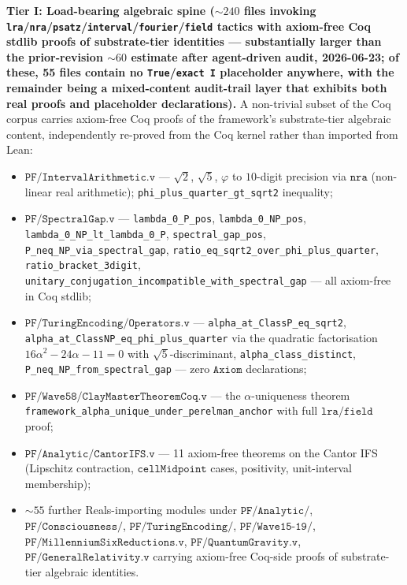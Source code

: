 \documentclass[11pt,a4paper]{amsart}
\theoremstyle{plain}
\theoremstyle{definition}
\begin{document}
\textbf{Tier I: Load-bearing algebraic spine ($\sim 240$ files invoking \texttt{lra}/\texttt{nra}/\texttt{psatz}/\texttt{interval}/\texttt{fourier}/\texttt{field} tactics with axiom-free Coq stdlib proofs of substrate-tier identities --- substantially larger than the prior-revision $\sim 60$ estimate after agent-driven audit, 2026-06-23; of these, 55 files contain no \texttt{True}/\texttt{exact I} placeholder anywhere, with the remainder being a mixed-content audit-trail layer that exhibits both real proofs and placeholder declarations).} A non-trivial subset of the Coq corpus carries axiom-free Coq proofs of the framework's substrate-tier algebraic content, independently re-proved from the Coq kernel rather than imported from Lean:
\begin{itemize}[leftmargin=2em,itemsep=2pt]
\item $\texttt{PF/IntervalArithmetic.v}$ --- $\sqrt{2}$, $\sqrt{5}$, $\varphi$ to $10$-digit precision via $\texttt{nra}$ (non-linear real arithmetic); \texttt{phi\_plus\_quarter\_gt\_sqrt2} inequality;
\item $\texttt{PF/SpectralGap.v}$ --- \texttt{lambda\_0\_P\_pos}, \texttt{lambda\_0\_NP\_pos}, \texttt{lambda\_0\_NP\_lt\_lambda\_0\_P}, \texttt{spectral\_gap\_pos}, \texttt{P\_neq\_NP\_via\_spectral\_gap}, \texttt{ratio\_eq\_sqrt2\_over\_phi\_plus\_quarter}, \texttt{ratio\_bracket\_3digit}, \texttt{unitary\_conjugation\_incompatible\_with\_spectral\_gap} --- all axiom-free in Coq stdlib;
\item $\texttt{PF/TuringEncoding/Operators.v}$ --- \texttt{alpha\_at\_ClassP\_eq\_sqrt2}, \texttt{alpha\_at\_ClassNP\_eq\_phi\_plus\_quarter} via the quadratic factorisation $16\alpha^2 - 24\alpha - 11 = 0$ with $\sqrt{5}$-discriminant, \texttt{alpha\_class\_distinct}, \texttt{P\_neq\_NP\_from\_spectral\_gap} --- zero $\texttt{Axiom}$ declarations;
\item $\texttt{PF/Wave58/ClayMasterTheoremCoq.v}$ --- the $\alpha$-uniqueness theorem \texttt{framework\_alpha\_unique\_under\_perelman\_anchor} with full $\texttt{lra}/\texttt{field}$ proof;
\item $\texttt{PF/Analytic/CantorIFS.v}$ --- 11 axiom-free theorems on the Cantor IFS (Lipschitz contraction, $\texttt{cellMidpoint}$ cases, positivity, unit-interval membership);
\item $\sim 55$ further Reals-importing modules under $\texttt{PF/Analytic/}$, $\texttt{PF/Consciousness/}$, $\texttt{PF/TuringEncoding/}$, $\texttt{PF/Wave15-19/}$, $\texttt{PF/MillenniumSixReductions.v}$, $\texttt{PF/QuantumGravity.v}$, $\texttt{PF/GeneralRelativity.v}$ carrying axiom-free Coq-side proofs of substrate-tier algebraic identities.
\end{itemize}
\end{document}
